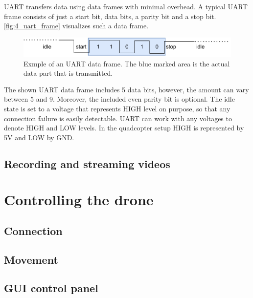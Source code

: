 \noindent UART transfers data using data frames with minimal overhead.
A typical UART frame consists of just a start bit, data bits, a parity bit and
a stop bit.
\autoref{fig:4_uart_frame} visualizes such a data frame. 
\begin{figure}[!h]
    \centering
    \includegraphics[scale=0.8]{uart_frame.pdf}
    \caption[UART data frame]{Exmple of an UART data frame. The blue marked
    area is the actual data part that is transmitted.}
    \label{fig:4_uart_frame}
\end{figure}
\FloatBarrier
\noindent The shown UART data frame includes 5 data bits, however, the amount
can vary between 5 and 9.
Moreover, the included even parity bit is optional.
The idle state is set to a voltage that represents HIGH level on purpose, so
that any connection failure is easily detectable.
UART can work with any voltages to denote HIGH and LOW levels.
In the quadcopter setup HIGH is represented by 5V and LOW by GND.

\subsection{Recording and streaming videos}\label{subsec:4_rec_stream_video}

\section{Controlling the drone}\label{sec:4_drone_ctrl}

\subsection{Connection}\label{subsec:4_drone_conn}
\subsection{Movement}\label{subsec:4_drone_mvmnt}
\subsection{GUI control panel}\label{subsec:4_drone_ctrl_panel_gui}
